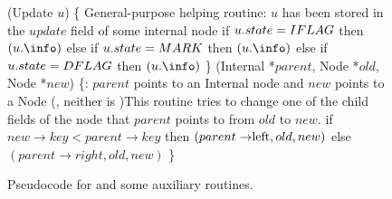 \begin{figure*}
\begin{code}
(Update $u$) \{ \tabtabcom General-purpose helping routine\ul
\n    {}:  $u$ has been stored in the $update$ field of some internal node\nl
      if $u.state = IF\scriptsize LAG \normalsize$ then $(u.\info)$\label{call-HelpInsert}\nl
      else if $u.state = M\scriptsize ARK \normalsize$ then $(u.\info)$\label{call-hm2}\nl
      else if $u.state = DF\scriptsize LAG \normalsize$ then $(u.\info)$\label{call-HelpDelete}\nl
\p
\}\bl
\nl
{}(Internal *$parent$, Node *$old$, Node *$new$) \{\label{CAS-Child}\ul
\n  {}:  $parent$ points to an Internal node and $new$ points to a Node (\ie, neither is \NULL)\ul
    \com This routine tries to change one of the child fields of the node that $parent$ points to from $old$ to $new$.\nl
    if $new \rightarrow key < parent\rightarrow key$ then\label{which-child}\nl
\n       \CAS$(parent\rightarrow \lft, old, new)$\label{child-cas-1}\nl
\p  else\nl
\n       \CAS$(parent\rightarrow right, old, new)$\label{child-cas-2}\nl
\p\p 
\}
\end{code}
\caption{\label{code3}Pseudocode for  and some auxiliary routines.}
\end{figure*}

